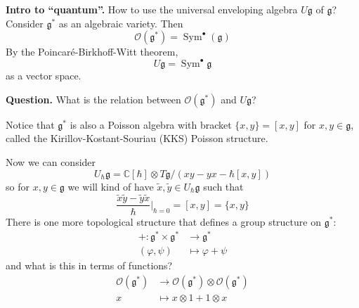 \medskip\noindent
{\bf Intro to ``quantum''.}
How to use the universal enveloping
algebra $U\mathfrak{g}$ of
$\mathfrak{g}$? Consider
$\mathfrak{g}^{*}$ as an algebraic
variety. Then
$$
\mathcal{O}(\mathfrak{g}^{*})=
\operatorname{Sym}^{\bullet}(\mathfrak{g})
$$
By the Poincar\'e-Birkhoff-Witt theorem,
$$
U\mathfrak{g}=
\operatorname{Sym}^{\bullet}\mathfrak{g}
$$
as a vector space.

\begin{remark}
\label{remark-l1-question}
{\bf Question.}
What is the relation between
$\mathcal{O}(\mathfrak{g}^{*})$ and
$U\mathfrak{g}$?
\end{remark}

Notice that $\mathfrak{g}^{*}$ is also a
Poisson algebra with bracket
$\{x,y\} =[x,y]$ for
$x,y\in \mathfrak{g}$, called the
Kirillov-Kostant-Souriau (KKS) Poisson
structure.

Now we can consider
$$
U_{\hbar}\mathfrak{g}=
\mathbb{C}[\hbar]\otimes
T\mathfrak{g}/(xy-yx-\hbar [x,y])
$$
so for $x,y\in \mathfrak{g}$ we will kind
of have
$\widetilde{x},\widetilde{y}\in
U_{\hbar}\mathfrak{g}$ such that
$$
\frac{\widetilde{x}\widetilde{y}-
\widetilde{y}\widetilde{x}}{\hbar}
\Big|_{\hbar =0}=[x,y]=\{x,y\}
$$
There is one more topological structure
that defines a group structure on
$\mathfrak{g}^{*}$:
$$
\begin{aligned}
+: \mathfrak{g}^{*}\times
\mathfrak{g}^{*} &\longrightarrow
\mathfrak{g}^{*}\\
(\varphi,\psi) &\longmapsto \varphi +\psi
\end{aligned}
$$
and what is this in terms of functions?
$$
\begin{aligned}
\mathcal{O}(\mathfrak{g}^{*} )
&\longrightarrow
\mathcal{O}(\mathfrak{g}^{*})\otimes
\mathcal{O}(\mathfrak{g}^{*}) \\
x &\longmapsto x\otimes 1+1\otimes x
\end{aligned}
$$

